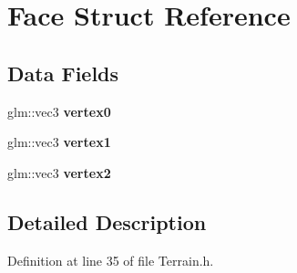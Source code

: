 \hypertarget{struct_face}{}\section{Face Struct Reference}
\label{struct_face}
\subsection*{Data Fields}
\begin{DoxyCompactItemize}
\item 
glm\+::vec3 {\bfseries vertex0}\hypertarget{struct_face_a8803c329f74eb6b2f3839114c2946bc3}{}\label{struct_face_a8803c329f74eb6b2f3839114c2946bc3}

\item 
glm\+::vec3 {\bfseries vertex1}\hypertarget{struct_face_a587a818a98e51b0f48aba21dfca29bda}{}\label{struct_face_a587a818a98e51b0f48aba21dfca29bda}

\item 
glm\+::vec3 {\bfseries vertex2}\hypertarget{struct_face_a1e98ca0f2f18fd0e50e99844b92459e6}{}\label{struct_face_a1e98ca0f2f18fd0e50e99844b92459e6}

\end{DoxyCompactItemize}


\subsection{Detailed Description}


Definition at line 35 of file Terrain.\+h.

